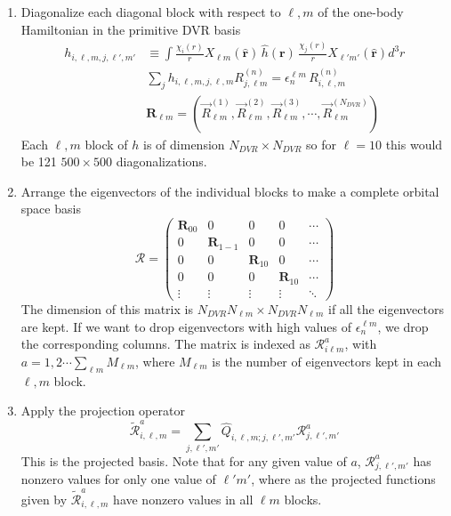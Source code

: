 \documentclass[%
pra%
,twocolumn%
,amssymb, nobibnotes, aps,
longbibliography
]{revtex4-1}
\begin{document}
\begin{enumerate}
\item{ Diagonalize each diagonal block with respect to $\ell, m$ of the one-body Hamiltonian in the primitive DVR basis
\begin{equation}
\begin{split}
 h_{i,\ell,m, j, \ell',m'} &\equiv \int \frac{\chi_i(r)}{r} X_{\ell m}(\mathbf{\hat{r}}) \, \hat{h}(\mathbf{r}) \,  \frac{\chi_j(r)}{r} X_{\ell' m'}(\mathbf{\hat{r}}) d^3r\\
& \sum_{j}h_{i,\ell,m, j, \ell,m} R^{(n)}_{j,\ell m} = \epsilon_{n}^{\ell m} \, R^{(n)}_{i,\ell, m} \\
&\mathbf{R}_{\ell m} = \left(  \vec{R}^{(1)}_{\ell m},  \vec{R}^{(2)}_{\ell m},  \vec{R}^{(3)}_{\ell m}, \cdots, \vec{R}^{(N_{DVR})}_{\ell m} \right)
 \end{split}
\end{equation}
Each $\ell,m$ block of $h$ is of dimension $N_{DVR} \times N_{DVR}$ so for $\ell = 10$ this would be 121 $500 \times 500$ diagonalizations.
}
\item{Arrange the eigenvectors of the individual blocks to make a complete orbital space basis
\begin{equation}
\boldsymbol{\mathcal{R}}=\begin{pmatrix}
\mathbf{R}_{0 0} & 0&0&0& \cdots \\
0&\mathbf{R}_{1 -1} &0&0&\cdots \\
0&0&\mathbf{R}_{1 0} &0&\cdots \\
0&0 &0&\mathbf{R}_{1 0}&\cdots \\
\vdots&\vdots&\vdots&\vdots&\ddots
\end{pmatrix}
\end{equation}
The dimension of this matrix is $N_{DVR} N_{\ell m} \times N_{DVR} N_{\ell m}$ if all the eigenvectors are kept. If we want to drop eigenvectors 
with high values of $\epsilon_{n}^{\ell m}$, we drop the corresponding columns.  The matrix is indexed as
$\mathcal{R}_{i \ell m}^{a}$, with $a = 1,2 \cdots \sum_{\ell m}M_{\ell m}$, where $M_{\ell m}$ is the number of eigenvectors kept in  each $\ell,m$ block.
}
\item{Apply the projection operator
\begin{equation}
\tilde{\mathcal{R}}_{i,\ell,m}^a=\sum_{j,\ell',m'} \hat{Q}_{i,\ell,m ; j, \ell',m'} \mathcal{R}_{j,\ell',m'}^{a}
\end{equation}
This is the projected basis. Note that for any given value of $a$, $ \mathcal{R}_{j,\ell',m'}^{a}$ has nonzero values for only one value of $\ell' m'$, where as the projected functions given by $\tilde{\mathcal{R}}_{i,\ell,m}^a$ have nonzero values in all $\ell m$ blocks.
}
\end{enumerate}
\end{document}
